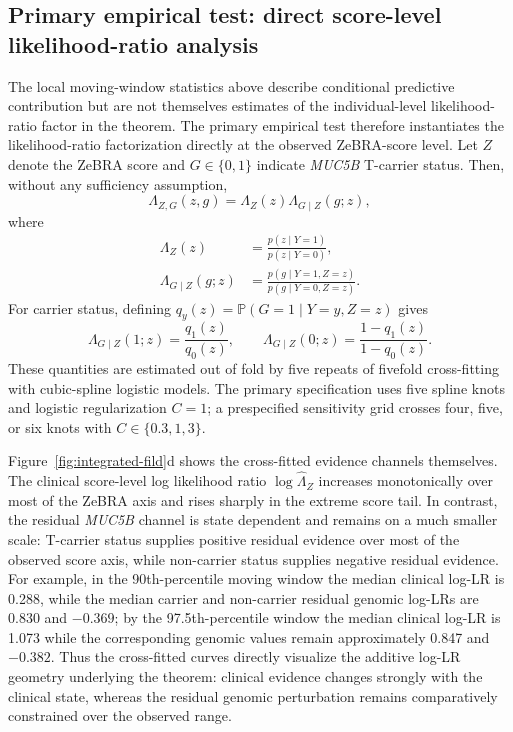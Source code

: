 \subsection{Primary empirical test: direct score-level likelihood-ratio analysis}
The local moving-window statistics above describe conditional predictive contribution but are not themselves estimates of the individual-level likelihood-ratio factor in the theorem. The primary empirical test therefore instantiates the likelihood-ratio factorization directly at the observed ZeBRA-score level. Let $Z$ denote the ZeBRA score and $G\in\{0,1\}$ indicate \textit{MUC5B} T-carrier status. Then, without any sufficiency assumption,
\begin{equation}
\Lambda_{Z,G}(z,g)=\Lambda_Z(z)\Lambda_{G\mid Z}(g;z),
\end{equation}
where
\begin{align}
\Lambda_Z(z)&=\frac{p(z\mid Y=1)}{p(z\mid Y=0)},\\
\Lambda_{G\mid Z}(g;z)&=\frac{p(g\mid Y=1,Z=z)}{p(g\mid Y=0,Z=z)}.
\end{align}
For carrier status, defining $q_y(z)=\mathbb{P}(G=1\mid Y=y,Z=z)$ gives
\begin{equation}
\Lambda_{G\mid Z}(1;z)=\frac{q_1(z)}{q_0(z)},\qquad
\Lambda_{G\mid Z}(0;z)=\frac{1-q_1(z)}{1-q_0(z)}.
\end{equation}
These quantities are estimated out of fold by five repeats of fivefold cross-fitting with cubic-spline logistic models. The primary specification uses five spline knots and logistic regularization $C=1$; a prespecified sensitivity grid crosses four, five, or six knots with $C\in\{0.3,1,3\}$.

Figure~\ref{fig:integrated-fild}d shows the cross-fitted evidence channels themselves. The clinical score-level log likelihood ratio $\log\widehat\Lambda_Z$ increases monotonically over most of the ZeBRA axis and rises sharply in the extreme score tail. In contrast, the residual \textit{MUC5B} channel is state dependent and remains on a much smaller scale: T-carrier status supplies positive residual evidence over most of the observed score axis, while non-carrier status supplies negative residual evidence. For example, in the 90th-percentile moving window the median clinical log-LR is 0.288, while the median carrier and non-carrier residual genomic log-LRs are 0.830 and $-0.369$; by the 97.5th-percentile window the median clinical log-LR is 1.073 while the corresponding genomic values remain approximately 0.847 and $-0.382$. Thus the cross-fitted curves directly visualize the additive log-LR geometry underlying the theorem: clinical evidence changes strongly with the clinical state, whereas the residual genomic perturbation remains comparatively constrained over the observed range.

